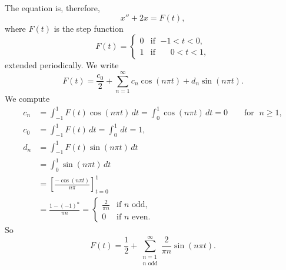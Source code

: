 \documentclass{ximera}
\begin{document}
\begin{exampleSol}
    The equation is, therefore,
    \begin{equation*}
        x'' + 2 x = F(t) ,
    \end{equation*}
    where $F(t)$ is the step function
    \begin{equation*}
        F(t) =
        \begin{cases}
            0 & \text{if } \; {-1} < t < 0 , \\
            1 & \text{if } \; \phantom{-}0 < t < 1 ,
        \end{cases}
    \end{equation*}
    extended periodically. We write
    \begin{equation*}
        F(t) = \frac{c_0}{2} + \sum_{n=1}^\infty c_n \cos (n \pi t) + d_n \sin (n \pi t) .
    \end{equation*}
    We compute
    \begin{align*}
        c_n & = \int_{-1}^1 F(t) \cos (n \pi t) \, dt = \int_{0}^1 \cos (n \pi t) \, dt = 0 \qquad \text{for } \; n \geq 1, \\
        c_0 & = \int_{-1}^1 F(t) \, dt = \int_{0}^1 \, dt = 1 , \\
        d_n & = \int_{-1}^1 F(t) \sin (n \pi t) \, dt \\
        & = \int_{0}^1 \sin (n \pi t) \, dt \\
        & = \left[ \frac{-\cos (n \pi t)}{n \pi} \right]_{t=0}^1 \\
        & = \frac{1-{(-1)}^n}{\pi n} =
        \begin{cases}
            \frac{2}{\pi n} & \text{if } n \text{ odd} , \\
            0 & \text{if } n \text{ even} .
        \end{cases}
    \end{align*}
    So
    \begin{equation*}
        F(t) = \frac{1}{2} + \sum_{\substack{n=1 \\ n \text{ odd}}}^\infty \frac{2}{\pi n} \sin (n \pi t) .
    \end{equation*}
    

\end{exampleSol}
\end{document}
